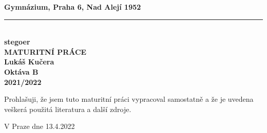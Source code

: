 
\begin{titlepage}
    \begin{center}
        \textbf{\large Gymnázium, Praha 6, Nad Alejí 1952}\\
        \vspace{0.2cm}
        \rule{\textwidth}{0.5pt}\\
        \vspace{5cm}
        \textbf{\Huge stegoer}\\
        \vspace{5cm}
        \textbf{\large MATURITNÍ PRÁCE}\\
        \vspace{2cm}
        \textbf{\large Lukáš Kučera}\\
        \textbf{Oktáva B}\\
        \vspace*{\fill}
        \textbf{\large 2021/2022}\\
    \end{center}
\end{titlepage}
\newpage
Prohlašuji, že jsem tuto maturitní práci vypracoval samostatně a že je uvedena veškerá použitá literatura a další zdroje.\newline
\begin{minipage}{0.7\textwidth}
    \vspace{1cm}
    V Praze dne 13.4.2022
\end{minipage}
\begin{minipage}{0.3\textwidth}
    \vspace{1cm}
    \begin{flushright}
        \vspace{11pt}
        \hrulefill
    \end{flushright}
\end{minipage}
\newpage
